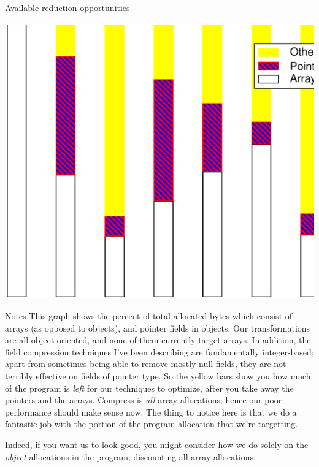\documentclass[%
pdf,
colorBG,
slideColor,
nototal,
oqe
]{prosper}
\newenvironment{talknotes}{\begin{slide}{Notes}\tiny}{\end{slide}}
\begin{document}
\begin{slide}{Available reduction opportunities}
\begin{center}
\includegraphics[scale=0.45]{Figures/spec-space-3.eps}
\end{center}
\end{slide}

\begin{talknotes}
This graph shows the percent of total allocated bytes which consist of
arrays (as opposed to objects), and pointer fields in objects.
Our transformations are all object-oriented, and none of them
currently target arrays.  In addition, the field compression
techniques I've been describing are fundamentally integer-based;
apart from sometimes being able to remove mostly-null fields,
they are not terribly effective on fields of pointer type.  So the
yellow bars show you how much of the program is \emph{left} for our
techniques to optimize, after you take away the pointers and the arrays.
Compress is \emph{all} array allocations; hence our poor performance
should make sense now.  The thing to notice here is that we do a
fantastic job with the portion of the program allocation that we're
targetting.

Indeed, if you want us to look good, you might consider how we do
solely on the \emph{object} allocations in the program; discounting
all array allocations.
\end{talknotes}
\end{document}
